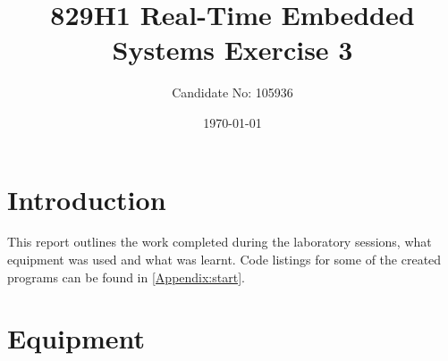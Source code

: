 \documentclass[a4paper,12pt]{scrartcl}
\title{829H1 Real-Time Embedded Systems Exercise 3}
\author{Candidate No: 105936}
\date{\today}
\begin{document}
	
	\begin{titlepage}
		\maketitle
	\end{titlepage}
	
	\tableofcontents
	\newpage
	
	\section{Introduction}
	{
		This report outlines the work completed during the laboratory sessions, what equipment was used and what was learnt. Code listings for some of the created programs can be found in \cref{Appendix:start}.
	}

	\section{Equipment}
\end{document}
